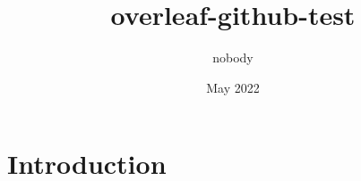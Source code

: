 \documentclass{article}
\title{overleaf-github-test}
\author{nobody}
\date{May 2022}
\begin{document}
\maketitle

\section{Introduction}
\end{document}
